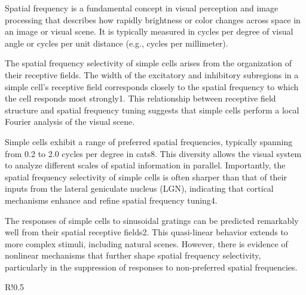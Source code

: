 Spatial frequency is a fundamental concept in visual perception and image processing that describes how rapidly brightness or color changes across space in an image or visual scene. It is typically measured in cycles per degree of visual angle or cycles per unit distance (e.g., cycles per millimeter).

The spatial frequency selectivity of simple cells arises from the organization of their receptive fields. The width of the excitatory and inhibitory subregions in a simple cell's receptive field corresponds closely to the spatial frequency to which the cell responds most strongly1. This relationship between receptive field structure and spatial frequency tuning suggests that simple cells perform a local Fourier analysis of the visual scene.

Simple cells exhibit a range of preferred spatial frequencies, typically spanning from 0.2 to 2.0 cycles per degree in cats8. This diversity allows the visual system to analyze different scales of spatial information in parallel. Importantly, the spatial frequency selectivity of simple cells is often sharper than that of their inputs from the lateral geniculate nucleus (LGN), indicating that cortical mechanisms enhance and refine spatial frequency tuning4.

The responses of simple cells to sinusoidal gratings can be predicted remarkably well from their spatial receptive fields2. This quasi-linear behavior extends to more complex stimuli, including natural scenes. However, there is evidence of nonlinear mechanisms that further shape spatial frequency selectivity, particularly in the suppression of responses to non-preferred spatial frequencies.

\begin{wrapfigure}{R!}{0.5\textwidth}
\begin{tcolorbox}[every float=\centering, drop shadow, title=Concept of Spatial Frequency ,colback=white,colframe=WMgreen,
  colbacktitle=WMgreen,]
  \label{fig:spatialfrequency}
 \end{tcolorbox}
\end{wrapfigure}
\FloatBarrier

